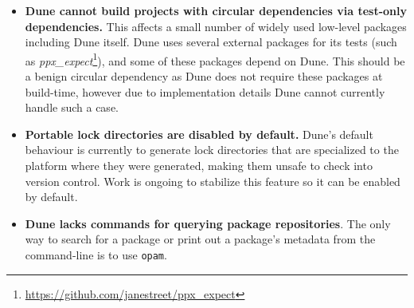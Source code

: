 \documentclass{article}
\begin{document}
\begin{multicols}{2}
        \begin{itemize}
            \item \textbf{Dune cannot build projects with circular dependencies
                via test-only dependencies.} This affects a small number of
                widely used low-level packages including Dune itself. Dune uses
                several external packages for its tests (such as
                \textit{ppx\_expect}\footnote{\url{https://github.com/janestreet/ppx_expect}}),
                and some of these packages depend on
                Dune. This should be a benign circular dependency as Dune does
                not require these packages at build-time, however due to
                implementation details Dune cannot currently handle such a case.
            \item \textbf{Portable lock directories are disabled by default.}
                Dune's default behaviour is currently to generate lock
                directories that are specialized to the platform where they were
                generated, making them unsafe to check into version control.
                Work is ongoing to stabilize this feature so it can be enabled
                by default.
            \item \textbf{Dune lacks commands for querying package
                repositories}. The only way to search for a package or print out
		a package's metadata from the command-line is to use \texttt{opam}.
        \end{itemize}

    \end{multicols}
\end{document}
